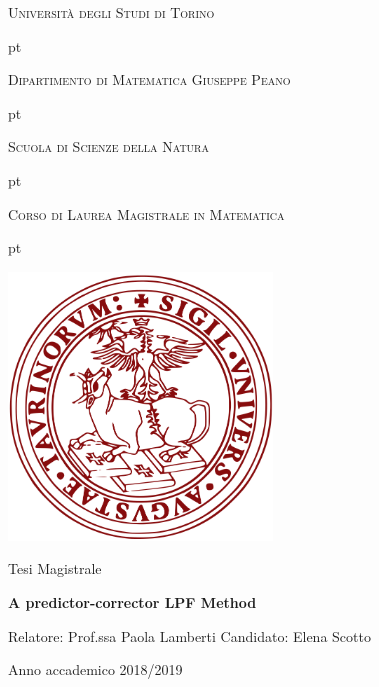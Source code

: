 \documentclass[a4paper,10 pt,titlepage,twoside]{book}
\theoremstyle{plain}
\theoremstyle{definition}
\theoremstyle{remark}
\begin{document}
\thispagestyle{empty}

\centerline {\huge{\textsc{Università degli Studi di Torino}}}
 pt

\centerline {\Large{\textsc{Dipartimento di Matematica Giuseppe Peano}}}

 pt

\centerline {\Large{\textsc{Scuola di Scienze della Natura}}}

 pt

\centerline {\Large{\textsc{Corso di Laurea Magistrale in Matematica}}}


 pt





\centerline {\includegraphics[width=7cm]{logo.jpg}}
\vskip 1.2cm
\centerline {\normalsize {Tesi Magistrale}} 

\vskip 0.7cm

\centerline {\Large {\bf A predictor-corrector LPF Method}}

\vskip 1.7cm

\noindent Relatore: Prof.ssa Paola Lamberti
\hfill  {Candidato: Elena Scotto }\\





\vskip 2.7cm


\centerline{Anno accademico 2018/2019}

\tableofcontents

% 
%
\end{document}
